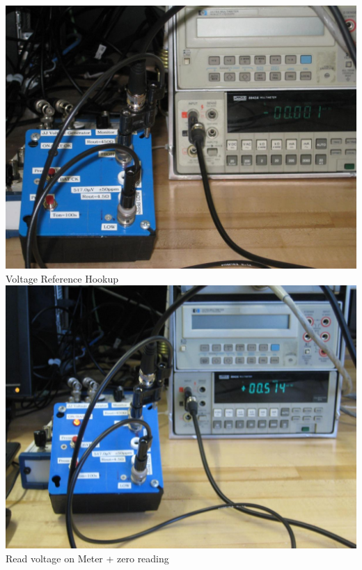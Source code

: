 \documentclass{../lab}
\begin{document}
\begin{minipage}[t]{0.5\linewidth}
    \centering
    \href{http://experimentationlab.berkeley.edu/sites/default/files/JOS/V-Ref-Hookup_4055.JPG}{\includegraphics[width=0.97\linewidth,keepaspectratio]{images/V-Ref-Hookup_4055.JPG}} \\
    Voltage Reference Hookup \\\vspace{1em}
    \href{http://experimentationlab.berkeley.edu/sites/default/files/JOS/V-Ref_setup-517uV_4061.JPG}{\includegraphics[width=0.97\linewidth,keepaspectratio]{images/V-Ref_setup-517uV_4061.JPG}} \\
    Read voltage on Meter + zero reading
\end{minipage}
\end{document}
